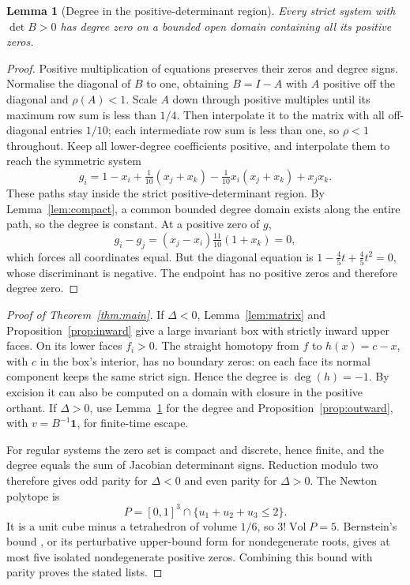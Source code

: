 \documentclass[11pt]{article}
\newtheorem{lemma}[theorem]{Lemma}
\theoremstyle{remark}\newtheorem{remark}[theorem]{Remark}
\newcommand{\degB}{\operatorname{deg}}
\newcommand{\one}{\mathbf 1}
\begin{document}
\begin{lemma}[Degree in the positive-determinant region]\label{lem:degree0}
Every strict system with $\det B>0$ has degree zero on a bounded open domain
containing all its positive zeros.
\end{lemma}
\begin{proof}
Positive multiplication of equations preserves their zeros and degree signs.
Normalise the diagonal of $B$ to one, obtaining $B=I-A$ with $A$ positive off
the diagonal and $\rho(A)<1$. Scale $A$ down through positive multiples until
its maximum row sum is less than $1/4$. Then interpolate it to the matrix
with all off-diagonal entries $1/10$; each intermediate row sum is less than one,
so $\rho<1$ throughout. Keep all lower-degree coefficients positive, and
interpolate them to reach the symmetric system
\[
 g_i=1-x_i+\tfrac1{10}(x_j+x_k)
            -\tfrac1{10}x_i(x_j+x_k)+x_jx_k.
\]
These paths stay inside the strict positive-determinant region. By
Lemma~\ref{lem:compact}, a common bounded degree domain exists along the entire
path, so the degree is constant. At a positive zero of $g$,
\[
 g_i-g_j=(x_j-x_i)\tfrac{11}{10}(1+x_k)=0,
\]
which forces all coordinates equal. But the diagonal equation is
$1-\tfrac45 t+\tfrac45 t^2=0$, whose discriminant is negative. The endpoint
has no positive zeros and therefore degree zero.
\end{proof}

\begin{proof}[Proof of Theorem~\ref{thm:main}]
If $\Delta<0$, Lemma~\ref{lem:matrix} and Proposition~\ref{prop:inward} give a
large invariant box with strictly inward upper faces. On its lower faces
$f_i>0$. The straight homotopy from $f$ to $h(x)=c-x$, with $c$ in the box's
interior, has no boundary zeros: on each face its normal component keeps the
same strict sign. Hence the degree is $\degB(h)=-1$.
By excision it can also be computed on a domain with closure in the positive
orthant. If $\Delta>0$, use Lemma~\ref{lem:degree0} for the degree and
Proposition~\ref{prop:outward}, with $v=B^{-1}\one$, for finite-time escape.

For regular systems the zero set is compact and discrete, hence finite, and
the degree equals the sum of Jacobian determinant signs. Reduction modulo two
therefore gives odd parity for $\Delta<0$ and even parity for $\Delta>0$.
The Newton polytope is
\[
 P=[0,1]^3\cap\{u_1+u_2+u_3\le2\}.
\]
It is a unit cube minus a tetrahedron of volume $1/6$, so $3!\operatorname{Vol}P=5$.
Bernstein's bound \cite{Bernstein}, or its perturbative upper-bound form for
nondegenerate roots, gives at most five isolated nondegenerate positive zeros.
Combining this bound with parity proves the stated lists.
\end{proof}
\end{document}
